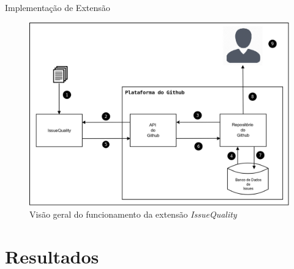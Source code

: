 \documentclass[t,14pt,mathserif]{beamer}
\begin{document}
\begin{frame}{Implementação de Extensão}

    \begin{figure}[htpb]
        \centering
        \includegraphics[width=0.7\linewidth]{../img/diagrama_funcionamento_issuequality.png}
        \caption{Visão geral do funcionamento da extensão \textit{IssueQuality}}
\label{fig:diagrama_funcionamento_issuequality}
    \end{figure}
\end{frame}

\section{Resultados}
\end{document}

